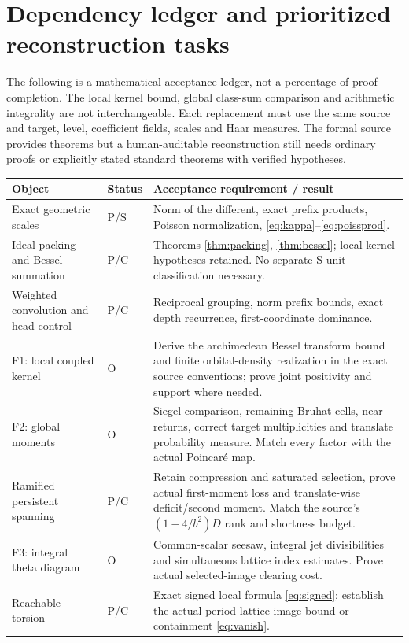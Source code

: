 \documentclass[11pt,a4paper]{article}
\begin{document}
\section{Dependency ledger and prioritized reconstruction tasks}\label{sec:ledger}
The following is a mathematical acceptance ledger, not a percentage of proof completion. The local kernel bound, global class-sum comparison and arithmetic integrality are not interchangeable. Each replacement must use the same source and target, level, coefficient fields, scales and Haar measures. The formal source provides theorems but a human-auditable reconstruction still needs ordinary proofs or explicitly stated standard theorems with verified hypotheses.
\begin{longtable}{p{}p{}p{}}
\toprule\textbf{Object}&\textbf{Status}&\textbf{Acceptance requirement / result}\\\midrule\endhead
Exact geometric scales & P/S & Norm of the different, exact prefix products, Poisson normalization, \eqref{eq:kappa}--\eqref{eq:poissprod}.\\
Ideal packing and Bessel summation & P/C & Theorems \ref{thm:packing}, \ref{thm:bessel}; local kernel hypotheses retained. No separate S-unit classification necessary.\\
Weighted convolution and head control & P/C & Reciprocal grouping, norm prefix bounds, exact depth recurrence, first-coordinate dominance.\\
F1: local coupled kernel & O & Derive the archimedean Bessel transform bound and finite orbital-density realization in the exact source conventions; prove joint positivity and support where needed.\\
F2: global moments & O & Siegel comparison, remaining Bruhat cells, near returns, correct target multiplicities and translate probability measure. Match every factor with the actual Poincar\'e map.\\
Ramified persistent spanning & P/C & Retain compression and saturated selection, prove actual first-moment loss and translate-wise deficit/second moment. Match the source's $(1-4/b^2)D$ rank and shortness budget.\\
F3: integral theta diagram & O & Common-scalar seesaw, integral jet divisibilities and simultaneous lattice index estimates. Prove actual selected-image clearing cost.\\
Reachable torsion & P/C & Exact signed local formula \eqref{eq:signed}; establish the actual period-lattice image bound or containment \eqref{eq:vanish}.\\

\end{longtable}
\end{document}
